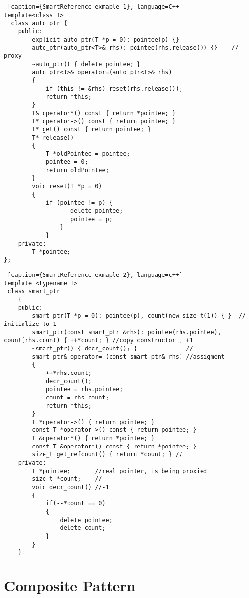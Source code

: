 \documentclass{book}
\begin{document}
\begin{lstlisting} [caption={SmartReference exmaple 1}, language=C++]
template<class T>    
  class auto_ptr {    
    public:    
        explicit auto_ptr(T *p = 0): pointee(p) {}    
        auto_ptr(auto_ptr<T>& rhs): pointee(rhs.release()) {}    // proxy
        ~auto_ptr() { delete pointee; }    
        auto_ptr<T>& operator=(auto_ptr<T>& rhs)    
        {    
            if (this != &rhs) reset(rhs.release());    
            return *this;    
        }    
        T& operator*() const { return *pointee; }    
        T* operator->() const { return pointee; }    
        T* get() const { return pointee; }    
        T* release()    
        {    
            T *oldPointee = pointee;    
            pointee = 0;    
            return oldPointee;    
        }    
        void reset(T *p = 0)    
        {    
            if (pointee != p) {    
                   delete pointee;    
                   pointee = p;    
                }    
            }    
    private:    
        T *pointee;    
};    
\end{lstlisting}

\begin{lstlisting} [caption={SmartReference exmaple 2}, language=c++]
template <typename T>  
 class smart_ptr  
    {  
    public:  
        smart_ptr(T *p = 0): pointee(p), count(new size_t(1)) { }  //  initialize to 1
        smart_ptr(const smart_ptr &rhs): pointee(rhs.pointee), count(rhs.count) { ++*count; } //copy constructor , +1
        ~smart_ptr() { decr_count(); }              //  
        smart_ptr& operator= (const smart_ptr& rhs) //assigment  
        {  
            ++*rhs.count;  
            decr_count();  
            pointee = rhs.pointee;  
            count = rhs.count;  
            return *this;  
        }    
        T *operator->() { return pointee; }  
        const T *operator->() const { return pointee; }  
        T &operator*() { return *pointee; }  
        const T &operator*() const { return *pointee; }  
        size_t get_refcount() { return *count; } //
    private:   
        T *pointee;       //real pointer, is being proxied
        size_t *count;    //  
        void decr_count() //-1  
        {  
            if(--*count == 0)   
            {  
                delete pointee;  
                delete count;  
            }  
        }  
    };  
\end{lstlisting}

\chapter{Composite Pattern}\label{CompositePattern}
\end{document}

